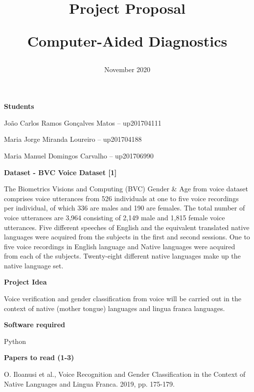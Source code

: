 \documentclass{article}
\title{\textbf{Project Proposal}\par Computer-Aided Diagnostics}
\date{\nth{10} November 2020}
\begin{document}
\maketitle

\centering
\textbf{Students}\par
João Carlos Ramos Gonçalves Matos – up201704111\par
Maria Jorge Miranda Loureiro – up201704188\par
Maria Manuel Domingos Carvalho – up201706990\par

\vspace{5mm}
\justify
\setlength{\parindent}{0pt}

\textbf{Dataset - BVC Voice Dataset [1]}\par

The Biometrics Visions and Computing (BVC) Gender & Age from voice dataset comprises voice utterances from 526 individuals at one to five voice recordings per individual, of which 336 are males and 190 are females. The total number of voice utterances are 3,964 consisting of 2,149 male and 1,815 female voice utterances. Five different speeches of English and the equivalent translated native languages were acquired from the subjects in the first and second sessions. One to five voice recordings in English language and Native languages were acquired from each of the subjects. Twenty-eight different native languages make up the native language set.\par


\vspace{5mm}
\textbf{Project Idea}\par
Voice verification and gender classification from voice will be carried out in the context of native (mother tongue) languages and lingua franca languages.\par

\vspace{5mm}
\textbf{Software required}\par
Python

\vspace{5mm}
\textbf{Papers to read (1-3)}\par
[1]	O. Iloanusi et al., Voice Recognition and Gender Classification in the Context of Native Languages and Lingua Franca. 2019, pp. 175-179.
\end{document}

